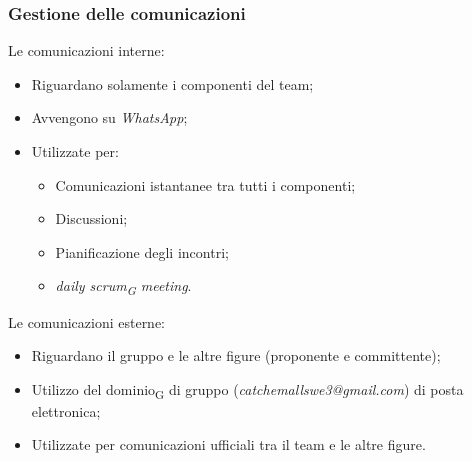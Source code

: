     \subsubsection{Gestione delle comunicazioni}
        Le comunicazioni interne:
        \begin{itemize}
            \item Riguardano solamente i componenti del team;
            \item Avvengono su \textit{WhatsApp};
            \item Utilizzate per:
                \begin{itemize}
                    \item Comunicazioni istantanee tra tutti i componenti;
                    \item Discussioni;
                    \item Pianificazione degli incontri;
                    \item \textit{daily scrum\textsubscript{G} meeting}.
                \end{itemize}
        \end{itemize}
            
        Le comunicazioni esterne:
        \begin{itemize}
            \item Riguardano il gruppo e le altre figure (proponente e committente);
            \item Utilizzo del dominio\textsubscript{G} di gruppo (\textit{catchemallswe3@gmail.com}) di posta elettronica;
            \item Utilizzate per comunicazioni ufficiali tra il team e le altre figure.
        \end{itemize}

        
        
